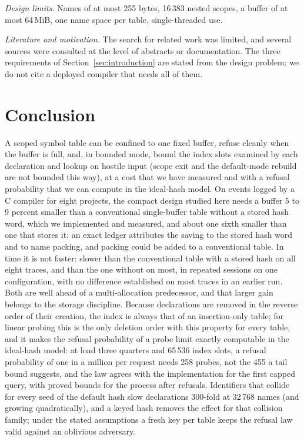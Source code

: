 \emph{Design limits.} Names of at most 255 bytes, 16\,383 nested scopes, a buffer of at most 64\,MiB, one name space per table, single-threaded use.

\emph{Literature and motivation.} The search for related work was limited, and several sources were consulted at the level of abstracts or documentation. The three requirements of Section~\ref{sec:introduction} are stated from the design problem; we do not cite a deployed compiler that needs all of them.

\section{Conclusion}
\label{sec:conclusion}
A scoped symbol table can be confined to one fixed buffer, refuse cleanly when the buffer is full, and, in bounded mode, bound the index slots examined by each declaration and lookup on hostile input (scope exit and the default-mode rebuild are not bounded this way), at a cost that we have measured and with a refusal probability that we can compute in the ideal-hash model. On events logged by a C compiler for eight projects, the compact design studied here needs a buffer 5 to 9 percent smaller than a conventional single-buffer table without a stored hash word, which we implemented and measured, and about one sixth smaller than one that stores it; an exact ledger attributes the saving to the stored hash word and to name packing, and packing could be added to a conventional table. In time it is not faster: slower than the conventional table with a stored hash on all eight traces, and than the one without on most, in repeated sessions on one configuration, with no difference established on most traces in an earlier run. Both are well ahead of a multi-allocation predecessor, and that larger gain belongs to the storage discipline. Because declarations are removed in the reverse order of their creation, the index is always that of an insertion-only table; for linear probing this is the only deletion order with this property for every table, and it makes the refusal probability of a probe limit exactly computable in the ideal-hash model: at load three quarters and 65\,536 index slots, a refusal probability of one in a million per request needs 258 probes, not the 455 a tail bound suggests, and the law agrees with the implementation for the first capped query, with proved bounds for the process after refusals. Identifiers that collide for every seed of the default hash slow declarations 300-fold at 32\,768 names (and growing quadratically), and a keyed hash removes the effect for that collision family; under the stated assumptions a fresh key per table keeps the refusal law valid against an oblivious adversary.

